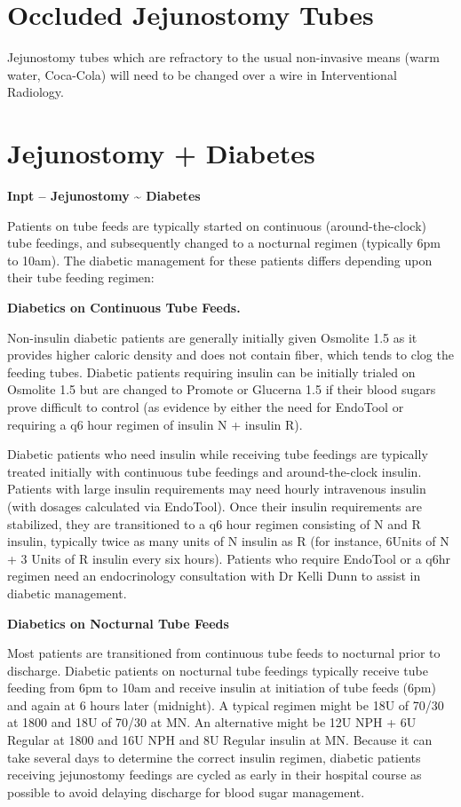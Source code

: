 \documentclass[
]{book}
\begin{document}
\hypertarget{occluded-jejunostomy-tubes}{%
\section{Occluded Jejunostomy Tubes}\label{occluded-jejunostomy-tubes}}

Jejunostomy tubes which are refractory to the usual non-invasive means (warm water, Coca-Cola) will need to be changed over a wire in Interventional Radiology.

\hypertarget{jejunostomy_diabetes}{%
\section{Jejunostomy + Diabetes}\label{jejunostomy_diabetes}}

\textbf{Inpt -- Jejunostomy \textasciitilde{} Diabetes}

Patients on tube feeds are typically started on continuous (around-the-clock) tube feedings, and subsequently changed to a nocturnal regimen (typically 6pm to 10am). The diabetic management for these patients differs depending upon their tube feeding regimen:

\textbf{Diabetics on Continuous Tube Feeds.}

Non-insulin diabetic patients are generally initially given Osmolite 1.5 as it provides higher caloric density and does not contain fiber, which tends to clog the feeding tubes. Diabetic patients requiring insulin can be initially trialed on Osmolite 1.5 but are changed to Promote or Glucerna 1.5 if their blood sugars prove difficult to control (as evidence by either the need for EndoTool or requiring a q6 hour regimen of insulin N + insulin R).

Diabetic patients who need insulin while receiving tube feedings are typically treated initially with continuous tube feedings and around-the-clock insulin. Patients with large insulin requirements may need hourly intravenous insulin (with dosages calculated via EndoTool). Once their insulin requirements are stabilized, they are transitioned to a q6 hour regimen consisting of N and R insulin, typically twice as many units of N insulin as R (for instance, 6Units of N + 3 Units of R insulin every six hours). Patients who require EndoTool or a q6hr regimen need an endocrinology consultation with Dr Kelli Dunn to assist in diabetic management.

\textbf{Diabetics on Nocturnal Tube Feeds}

Most patients are transitioned from continuous tube feeds to nocturnal prior to discharge. Diabetic patients on nocturnal tube feedings typically receive tube feeding from 6pm to 10am and receive insulin at initiation of tube feeds (6pm) and again at 6 hours later (midnight). A typical regimen might be 18U of 70/30 at 1800 and 18U of 70/30 at MN. An alternative might be 12U NPH + 6U Regular at 1800 and 16U NPH and 8U Regular insulin at MN. Because it can take several days to determine the correct insulin regimen, diabetic patients receiving jejunostomy feedings are cycled as early in their hospital course as possible to avoid delaying discharge for blood sugar management.
\end{document}
